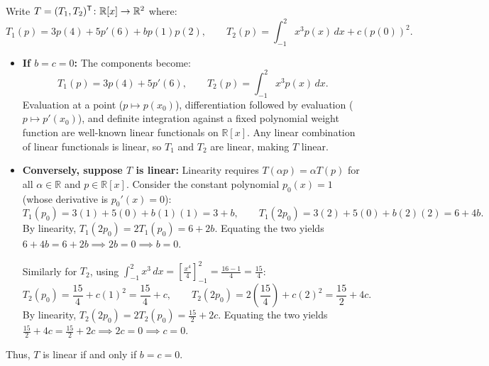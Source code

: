 \begin{exercisesolution}
\label{sol:polynomial_integral_eval_linear_map}
Write $T = (T_1, T_2)^{\mathsf{T}} \colon \mathbb{R}[x] \to \mathbb{R}^2$ where:
\[
T_1(p) = 3p(4) + 5p'(6) + b p(1)p(2), \qquad T_2(p) = \int_{-1}^2 x^3 p(x) \, dx + c (p(0))^2.
\]
\begin{itemize}
    \item \textbf{If $b = c = 0$:} The components become:
    \[
    T_1(p) = 3p(4) + 5p'(6), \qquad T_2(p) = \int_{-1}^2 x^3 p(x) \, dx.
    \]
    Evaluation at a point ($p \mapsto p(x_0)$), differentiation followed by evaluation ($p \mapsto p'(x_0)$), and definite integration against a fixed polynomial weight function are well-known linear functionals on $\mathbb{R}[x]$. Any linear combination of linear functionals is linear, so $T_1$ and $T_2$ are linear, making $T$ linear.

    \item \textbf{Conversely, suppose $T$ is linear:}
    Linearity requires $T(\alpha p) = \alpha T(p)$ for all $\alpha \in \mathbb{R}$ and $p \in \mathbb{R}[x]$.
    Consider the constant polynomial $p_0(x) = 1$ (whose derivative is $p_0'(x) = 0$):
    \[
    T_1(p_0) = 3(1) + 5(0) + b(1)(1) = 3 + b, \qquad T_1(2 p_0) = 3(2) + 5(0) + b(2)(2) = 6 + 4b.
    \]
    By linearity, $T_1(2 p_0) = 2 T_1(p_0) = 6 + 2b$. Equating the two yields $6 + 4b = 6 + 2b \implies 2b = 0 \implies b = 0$.

    Similarly for $T_2$, using $\int_{-1}^2 x^3 \, dx = \left[\frac{x^4}{4}\right]_{-1}^2 = \frac{16 - 1}{4} = \frac{15}{4}$:
    \[
    T_2(p_0) = \frac{15}{4} + c(1)^2 = \frac{15}{4} + c, \qquad T_2(2 p_0) = 2\left(\frac{15}{4}\right) + c(2)^2 = \frac{15}{2} + 4c.
    \]
    By linearity, $T_2(2 p_0) = 2 T_2(p_0) = \frac{15}{2} + 2c$. Equating the two yields $\frac{15}{2} + 4c = \frac{15}{2} + 2c \implies 2c = 0 \implies c = 0$.
\end{itemize}
Thus, $T$ is linear if and only if $b = c = 0$.
\end{exercisesolution}

